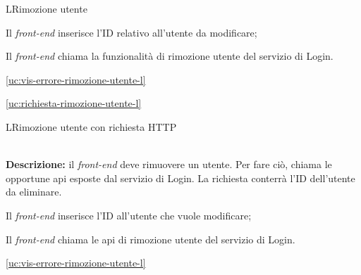 \begin{usecase}{7}{L}{Rimozione utente}



	\begin{ucscenarioprincipale}
		\item Il \textit{front-end} inserisce l'ID relativo all'utente da modificare;
		\item Il \textit{front-end} chiama la funzionalità di rimozione utente del servizio di Login.
	\end{ucscenarioprincipale}


	\begin{ucestensioni}
		\item \ref{uc:vis-errore-rimozione-utente-l}
	\end{ucestensioni}

	\begin{ucgeneralizzazioni}
		\item \ref{uc:richiesta-rimozione-utente-l}
	\end{ucgeneralizzazioni}

	\label{uc:rimozione-utente-l}
\end{usecase}

\begin{usecase}{8}{L}{Rimozione utente con richiesta HTTP}


	\textbf{\\Descrizione:} il \textit{front-end} deve rimuovere un utente. Per fare ciò,
	chiama le opportune \acrshort{api} esposte dal servizio di Login. La richiesta conterrà l'ID dell'utente da eliminare.

	\begin{ucscenarioprincipale}
		\item Il \textit{front-end} inserisce l'ID all'utente che vuole modificare;
		\item Il \textit{front-end} chiama le \acrshort{api} di rimozione utente del servizio di Login.
	\end{ucscenarioprincipale}


	\begin{ucestensioni}
		\item \ref{uc:vis-errore-rimozione-utente-l}
	\end{ucestensioni}

	\label{uc:richiesta-rimozione-utente-l}
\end{usecase}

